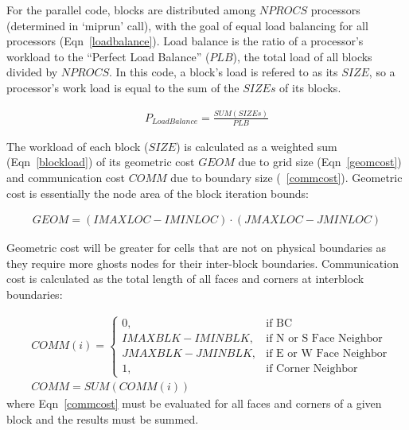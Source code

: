 \documentclass[twocolumn,10pt]{asme2ej}
\begin{document}
For the parallel code, blocks are distributed among $NPROCS$ processors (determined in `miprun’ call), with the goal of equal load balancing for all processors (Eqn~\ref{loadbalance}).  Load balance is the ratio of a processor's workload to the ``Perfect Load Balance'' ($PLB$), the total load of all blocks divided by $NPROCS$.  In this code, a block's load is refered to as its $SIZE$, so a processor's work load is equal to the sum of the $SIZEs$ of its blocks.

\vspace{-1em}
\begin{equation}
\begin{split}
P_{LoadBalance} = \frac{SUM(SIZEs)}{PLB}
\end{split}
\label{loadbalance}
\end{equation}

The workload of each block ($SIZE$) is calculated as a weighted sum (Eqn~\ref{blockload}) of its geometric cost $GEOM$ due to grid size (Eqn~\ref{geomcost}) and communication cost $COMM$ due to boundary size (~\ref{commcost}).  Geometric cost is essentially the node area of the block iteration bounds:

\vspace{-1em}
\begin{equation}
\begin{split}
GEOM = (IMAXLOC - IMINLOC) \cdot (JMAXLOC - JMINLOC)
\end{split}
\label{geomcost}
\end{equation}

\noindent Geometric cost will be greater for cells that are not on physical boundaries as they require more ghosts nodes for their inter-block boundaries.  Communication cost is calculated as the total length of all faces and corners at interblock boundaries:

\vspace{-1em}
\begin{equation}
\begin{split}
&COMM(i) =
      \begin{cases}
        0, & \text{if BC} \\
        IMAXBLK - IMINBLK, & \text{if N or S Face Neighbor} \\
        JMAXBLK - JMINBLK, & \text{if E or W Face Neighbor} \\
        1, & \text{if Corner Neighbor}
      \end{cases} \\
&COMM = SUM(COMM(i))
\end{split}
\label{commcost}
\end{equation}
\noindent where Eqn~\ref{commcost} must be evaluated for all faces and corners of a given block and the results must be summed.
\end{document}
